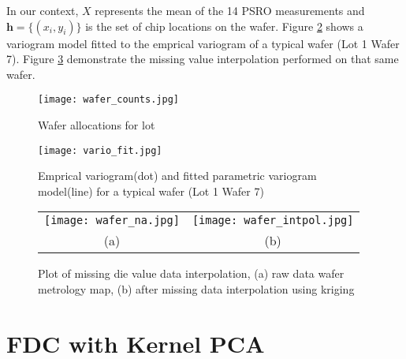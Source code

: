 \documentclass[12pt]{article}
\numberwithin{equation}{section}
\numberwithin{table}{section}
\numberwithin{figure}{section}
\newcommand{\bmh}{\bm{h}}
\newlength{\fwtwo} \setlength{\fwtwo}{0.48\textwidth}
\begin{document}
In our context, $X$ represents the mean of the 14 PSRO measurements
and $\bmh = \{ (x_i, y_i) \}$ is the set of chip locations on the wafer.
Figure \ref{vario_fit} shows a variogram model fitted to the
emprical variogram of a typical wafer (Lot 1 Wafer 7). Figure
\ref{wafer_fill} demonstrate the missing value interpolation performed
on that same wafer.

\begin{figure} \centering
  \texttt{[image: wafer\_counts.jpg]}
  \tiny \caption{Wafer allocations for lot}
  \label{wafer_counts}
\end{figure}

\begin{figure} \centering
  \texttt{[image: vario\_fit.jpg]}
  \tiny \caption{Emprical variogram(dot) and fitted parametric 
  variogram model(line) for a typical wafer (Lot 1 Wafer 7)}
  \label{vario_fit}
\end{figure}

\begin{figure} \centering
  \begin{tabular}{cc}
    \texttt{[image: wafer\_na.jpg]} &
    \texttt{[image: wafer\_intpol.jpg]} \\
    (a) & (b)
  \end{tabular}
  \caption{Plot of missing die value data interpolation,
  (a) raw data wafer metrology map, (b) after missing data
  interpolation using kriging}
  \label{wafer_fill}
\end{figure}




\section{FDC with Kernel PCA} \label{kernel}
\end{document}
